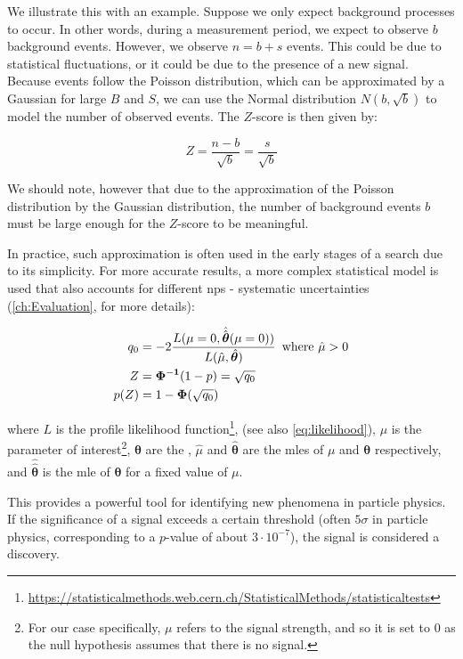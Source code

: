 We illustrate this with an example. Suppose we only expect background processes to occur. In other words, during a
measurement period, we expect to observe $b$ background events. However, we observe $n=b+s$ events. This
could be due to statistical fluctuations, or it could be due to the presence of a new signal. Because events follow the
Poisson distribution, which can be approximated by a Gaussian for large $B$ and $S$, we can use the Normal distribution
$N(b, \sqrt{b})$ to model the number of observed events. The $Z$-score is then given by:

\begin{equation}
    Z = \frac{n-b}{\sqrt{b}} = \frac{s}{\sqrt{b}}
\end{equation}

We should note, however that due to the approximation of the Poisson distribution by the Gaussian distribution, the
number of background events $b$ must be large enough for the $Z$-score to be meaningful.

In practice, such approximation is often used in the early stages of a search due to its simplicity. For more accurate
results, a more complex statistical model is used that also accounts for different \glspl{np} - systematic
uncertainties (\autoref{ch:Evaluation}, \cite{pract-stat-lhc, statistical} for more details):

\begin{align}
    q_0  & = -2 \frac{L(\mu=0, \hat{\hat{\bm{\theta}}}(\mu=0))}{L(\hat{\mu}, \hat{\bm{\theta}})} \, \text{ where $\hat{\mu} > 0$} \\
    Z    & = \mathbf{\Phi^{-1}}(1 - p) = \sqrt{q_0}                                                                                          \\
    p(Z) & = 1 - \mathbf{\Phi}(\sqrt{q_0})
\end{align}

where $L$ is the profile likelihood
function\footnote{\url{https://statisticalmethods.web.cern.ch/StatisticalMethods/statisticaltests}}, (see also
\autoref{eq:likelihood}), $\mu$ is the parameter of interest\footnote{For our case specifically, $\mu$ refers to the
    signal strength, and so it is set to $0$ as the null hypothesis assumes that there is no signal.}, $\bm{\theta}$ are
the , $\hat{\mu}$ and $\hat{\bm{\theta}}$ are the \glspl{mle} of $\mu$ and $\bm{\theta}$ respectively, and
$\hat{\hat{\bm{\theta}}}$ is the \gls{mle} of $\bm{\theta}$ for a fixed value of $\mu$.

This provides a powerful tool for identifying new phenomena in particle physics. If the significance of a signal exceeds
a certain threshold (often $5\sigma$ in particle physics, corresponding to a $p$-value of about $3\cdot10^{-7}$), the
signal is considered a discovery.

